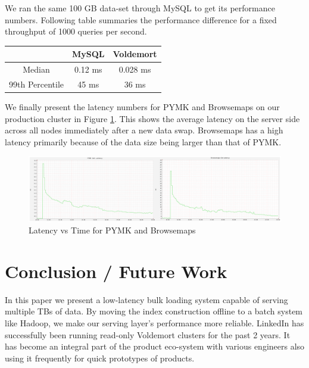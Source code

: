 \documentclass[10pt,twocolumn,preprint,natbib,authoryear]{sigplanconf}
\begin{document}
We ran the same 100 GB data-set through MySQL to get its performance numbers. Following table summaries the performance difference for a fixed throughput of 1000 queries per second. 

\begin{center}
    \begin{tabular}{ | c | c | c |  }
    \hline
     & MySQL & Voldemort \\ \hline
    Median &   0.12 ms &  0.028	ms \\
	99th Percentile	& 45 ms & 36 ms \\
\hline
    \end{tabular}
\end{center}

We finally present the latency numbers for PYMK and Browsemaps on our production cluster in Figure \ref{production}. This shows the average latency on the server side across all nodes immediately after a new data swap. Browsemaps has a high latency primarily because of the data size being larger than that of PYMK.

\begin{figure}
  \centering
    \includegraphics[scale=0.23]{get_latency.png}
  \caption{Latency vs Time for PYMK and Browsemaps}
  \label{production}
\end{figure}





\section{Conclusion / Future Work}
\label{sec:conclusion}

In this paper we present a low-latency bulk loading system capable of serving multiple TBs of data. By moving the index construction offline to a batch system like Hadoop, we make our serving layer's performance more reliable. LinkedIn has successfully been running read-only Voldemort clusters for the past 2 years. It has become an integral part of the product eco-system with various engineers also using it frequently for quick prototypes of products. 
\end{document}
